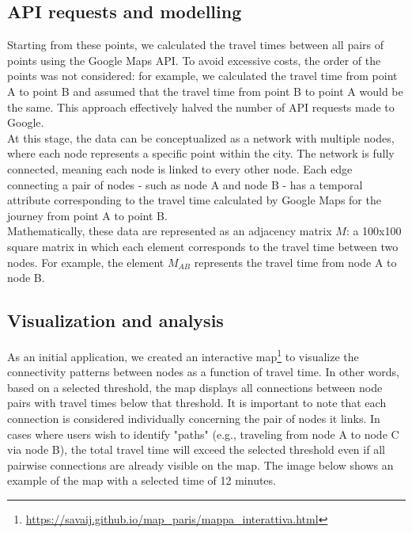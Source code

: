 \documentclass[a4paper,12pt]{article}
\begin{document}
\subsection{API requests and modelling}

Starting from these points, we calculated the travel times between all pairs of points using the Google Maps API. To avoid excessive costs, the order of the points was not considered: for example, we calculated the travel time from point A to point B and assumed that the travel time from point B to point A would be the same. This approach effectively halved the number of API requests made to Google.\\

At this stage, the data can be conceptualized as a network with multiple nodes, where each node represents a specific point within the city. The network is fully connected, meaning each node is linked to every other node. Each edge connecting a pair of nodes - such as node A and node B - has a temporal attribute corresponding to the travel time calculated by Google Maps for the journey from point A to point B. \\

Mathematically, these data are represented as an adjacency matrix $M$: a 100x100 square matrix in which each element corresponds to the travel time between two nodes. For example, the element $M_{AB}$ represents the travel time from node A to node B.

\subsection{Visualization and analysis}

As an initial application, we created an interactive map\footnote{\url{https://savaij.github.io/map_paris/mappa_interattiva.html}} to visualize the connectivity patterns between nodes as a function of travel time. In other words, based on a selected threshold, the map displays all connections between node pairs with travel times below that threshold. It is important to note that each connection is considered individually concerning the pair of nodes it links. In cases where users wish to identify "paths" (e.g., traveling from node A to node C via node B), the total travel time will exceed the selected threshold even if all pairwise connections are already visible on the map. The image below shows an example of the map with a selected time of 12 minutes.
\end{document}
